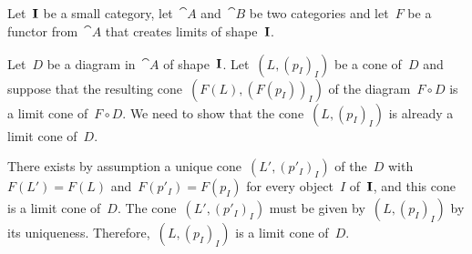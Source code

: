 \subsection{}

Let~$\mathbf{I}$ be a small category, let~$\cat{A}$ and~$\cat{B}$ be two categories and let~$F$ be a functor from~$\cat{A}$ that creates limits of shape~$\mathbf{I}$.

Let~$D$ be a diagram in~$\cat{A}$ of shape~$\mathbf{I}$.
Let~$(L, (p_I)_I)$ be a cone of~$D$ and suppose that the resulting cone~$(F(L), (F(p_I))_I)$ of the diagram~$F ∘ D$ is a limit cone of~$F ∘ D$.
We need to show that the cone~$(L, (p_I)_I)$ is already a limit cone of~$D$.

There exists by assumption a unique cone~$(L', (p'_I)_I)$ of the~$D$ with~$F(L') = F(L)$ and~$F(p'_I) = F(p_I)$ for every object~$I$ of~$\mathbf{I}$, and this cone is a limit cone of~$D$.
The cone~$(L', (p'_I)_I)$ must be given by~$(L, (p_I)_I)$ by its uniqueness.
Therefore,~$(L, (p_I)_I)$ is a limit cone of~$D$.
